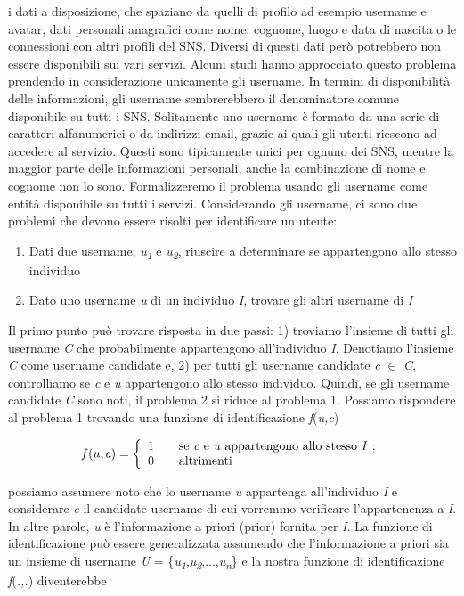 i dati a disposizione, che spaziano da quelli di profilo ad esempio username e avatar, dati personali anagrafici come nome, cognome, luogo e data di nascita o le connessioni con altri profili del SNS. Diversi di questi dati però potrebbero non essere disponibili sui vari servizi. Alcuni studi\cite{perito11}\cite{zafarani13} hanno approcciato questo problema prendendo in considerazione unicamente gli username. In termini di disponibilità delle informazioni, gli username sembrerebbero il denominatore comune disponibile su tutti i SNS. Solitamente uno username è formato da una serie di caratteri alfanumerici o da indirizzi email, grazie ai quali gli utenti riescono ad accedere al servizio. Questi sono tipicamente unici per ognuno dei SNS, mentre la maggior parte delle informazioni personali, anche la combinazione di nome e cognome non lo sono. Formalizzeremo il problema usando gli username come entità disponibile su tutti i servizi. Considerando gli username, ci sono due problemi che devono essere risolti per identificare un utente:

\begin{enumerate}
	\item Dati due username, \textit{u\textsubscript{1}} e \textit{u\textsubscript{2}}, riuscire a determinare se appartengono allo stesso individuo
	\item Dato uno username \textit{u} di un individuo \textit{I}, trovare gli altri username di \textit{I}
\end{enumerate}

Il primo punto può trovare risposta in due passi: 1) troviamo l'insieme di tutti gli username \textit{C} che probabilmente appartengono all'individuo \textit{I}. Denotiamo l'insieme \textit{C} come username candidate e, 2) per tutti gli username candidate \textit{c} $\in$ \textit{C}, controlliamo se \textit{c} e \textit{u} appartengono allo stesso individuo. Quindi, se gli username candidate \textit{C} sono noti, il problema 2 si riduce al problema 1. Possiamo rispondere al problema 1 trovando una funzione di identificazione \textit{f}(\textit{u,c})

\[ f(u,c) = \left\{
\begin{array}{l l}
	1 & \quad \text{se \textit{c} e \textit{u} appartengono allo stesso \textit{I} ;}\\
	0 & \quad \text{altrimenti}
	\end{array} \right.\]

possiamo assumere noto che lo username \textit{u} appartenga all'individuo \textit{I} e considerare \textit{c} il candidate username di cui vorremmo verificare l'appartenenza a \textit{I}. In altre parole, \textit{u} è l'informazione a priori (prior) fornita per \textit{I}. La funzione di identificazione può essere generalizzata assumendo che l'informazione a priori sia un insieme di username \textit{U} = \{\textit{u\textsubscript{1}},\textit{u\textsubscript{2}},...,\textit{u\textsubscript{n}}\} e la nostra funzione di identificazione \textit{f}(\textit{.,.}) diventerebbe

